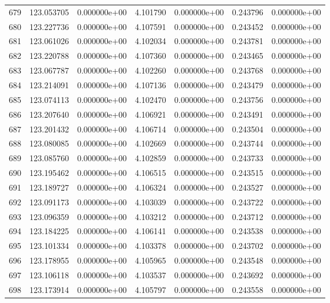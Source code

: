 \begin{tabular}{rrrrrrr}
 679 & 123.053705 &  0.000000e+00 &  4.101790 &  0.000000e+00 &   0.243796 &  0.000000e+00 \\
 680 & 123.227736 &  0.000000e+00 &  4.107591 &  0.000000e+00 &   0.243452 &  0.000000e+00 \\
 681 & 123.061026 &  0.000000e+00 &  4.102034 &  0.000000e+00 &   0.243781 &  0.000000e+00 \\
 682 & 123.220788 &  0.000000e+00 &  4.107360 &  0.000000e+00 &   0.243465 &  0.000000e+00 \\
 683 & 123.067787 &  0.000000e+00 &  4.102260 &  0.000000e+00 &   0.243768 &  0.000000e+00 \\
 684 & 123.214091 &  0.000000e+00 &  4.107136 &  0.000000e+00 &   0.243479 &  0.000000e+00 \\
 685 & 123.074113 &  0.000000e+00 &  4.102470 &  0.000000e+00 &   0.243756 &  0.000000e+00 \\
 686 & 123.207640 &  0.000000e+00 &  4.106921 &  0.000000e+00 &   0.243491 &  0.000000e+00 \\
 687 & 123.201432 &  0.000000e+00 &  4.106714 &  0.000000e+00 &   0.243504 &  0.000000e+00 \\
 688 & 123.080085 &  0.000000e+00 &  4.102669 &  0.000000e+00 &   0.243744 &  0.000000e+00 \\
 689 & 123.085760 &  0.000000e+00 &  4.102859 &  0.000000e+00 &   0.243733 &  0.000000e+00 \\
 690 & 123.195462 &  0.000000e+00 &  4.106515 &  0.000000e+00 &   0.243515 &  0.000000e+00 \\
 691 & 123.189727 &  0.000000e+00 &  4.106324 &  0.000000e+00 &   0.243527 &  0.000000e+00 \\
 692 & 123.091173 &  0.000000e+00 &  4.103039 &  0.000000e+00 &   0.243722 &  0.000000e+00 \\
 693 & 123.096359 &  0.000000e+00 &  4.103212 &  0.000000e+00 &   0.243712 &  0.000000e+00 \\
 694 & 123.184225 &  0.000000e+00 &  4.106141 &  0.000000e+00 &   0.243538 &  0.000000e+00 \\
 695 & 123.101334 &  0.000000e+00 &  4.103378 &  0.000000e+00 &   0.243702 &  0.000000e+00 \\
 696 & 123.178955 &  0.000000e+00 &  4.105965 &  0.000000e+00 &   0.243548 &  0.000000e+00 \\
 697 & 123.106118 &  0.000000e+00 &  4.103537 &  0.000000e+00 &   0.243692 &  0.000000e+00 \\
 698 & 123.173914 &  0.000000e+00 &  4.105797 &  0.000000e+00 &   0.243558 &  0.000000e+00 \\

\end{tabular}
